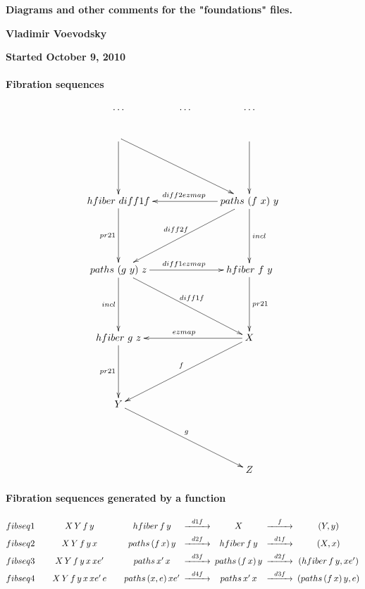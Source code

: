 \documentclass[11pt]{article}
\newcommand{\comment}[1]{}
\begin{document}
\begin{center}
{\Large\bf Diagrams and other comments for the "foundations" files.}

{\bf Vladimir Voevodsky}

{\bf Started October 9, 2010}
\end{center}


\paragraph{Fibration sequences}

$$
\xymatrix{
\dots & \dots& \dots\\
{} \ar[dd] \ar[ddrr]&  & {} \ar[dd]\\\\
{hfiber\,\, diff1f} \ar[dd]_{pr21} &&{paths\,\, (f\,\, x)\,\, y} \ar[ll]_{diff2ezmap} \ar[ddll]_{diff2f} \ar[dd]^{incl}\\\\
{paths\,\,(g\,\, y)\,\,z} \ar[dd]_{incl}\ar[ddrr]^{diff1f}\ar[rr]^{diff1ezmap}  &&  {hfiber\,\,f\,\,y} \ar[dd]^{pr21} \\\\
{hfiber\,\, g\,\,z} \ar[dd]_{pr21}   && X \ar[ll]_{ezmap}\ar[ddll]_{f} \\\\
Y\ar[ddrr]^{g}&\\\\
 && Z 
}
$$


\comment{{paths\,\,x'\,\, x} \ar[dd]_{tpair\,\, x\,\, -} \ar[ddrr]\ar[rr]&& {hfiber\,\, diff2f\,\, e}\ar[dd]^{pr21}\\\\
}

\paragraph{Fibration sequences generated by a function}


$$
\begin{CD}
fibseq1&\,\,\,\,\,\,\,\,\,\,\,\,&X\,Y\,f\,y &\,\,\,\,\,\,\,\,\,\,\,\,& hfiber\,f\,y @>d1f>> X @>f>> (Y,y)\\
fibseq2&\,\,\,\,\,\,\,\,\,\,\,\,&X\,Y\,f\,y\,x &\,\,\,\,\,\,\,\,\,\,\,\,& paths\,(f\, x)\,y @>d2f>> hfiber\,f\,y @>d1f>> (X,x)\\
fibseq3&\,\,\,\,\,\,\,\,\,\,\,\,&X\,Y\,f\,y\,x\,xe' &\,\,\,\,\,\,\,\,\,\,\,\,& paths\,x'\,x @>d3f>> paths\,(f\, x)\,y @>d2f>> (hfiber\,f\,y, xe')\\
fibseq4&\,\,\,\,\,\,\,\,\,\,\,\,&X\,Y\,f\,y\,x\,xe'\,e &\,\,\,\,\,\,\,\,\,\,\,\,& paths\,(x,e)\,xe' @>d4f>> paths\,x'\,x @>d3f>> (paths\,(f\, x)\,y, e)
\end{CD}
$$
\end{document}
